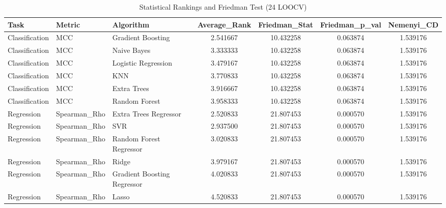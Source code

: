 \begin{table}
\caption{Statistical Rankings and Friedman Test (24 LOOCV)}
\label{tab:stat_ranks}
\begin{tabular}{lllcccc}
\toprule
Task & Metric & Algorithm & Average_Rank & Friedman_Stat & Friedman_p_val & Nemenyi_CD \\
\midrule
Classification & MCC & Gradient Boosting & 2.541667 & 10.432258 & 0.063874 & 1.539176 \\
Classification & MCC & Naive Bayes & 3.333333 & 10.432258 & 0.063874 & 1.539176 \\
Classification & MCC & Logistic Regression & 3.479167 & 10.432258 & 0.063874 & 1.539176 \\
Classification & MCC & KNN & 3.770833 & 10.432258 & 0.063874 & 1.539176 \\
Classification & MCC & Extra Trees & 3.916667 & 10.432258 & 0.063874 & 1.539176 \\
Classification & MCC & Random Forest & 3.958333 & 10.432258 & 0.063874 & 1.539176 \\
Regression & Spearman_Rho & Extra Trees Regressor & 2.520833 & 21.807453 & 0.000570 & 1.539176 \\
Regression & Spearman_Rho & SVR & 2.937500 & 21.807453 & 0.000570 & 1.539176 \\
Regression & Spearman_Rho & Random Forest Regressor & 3.020833 & 21.807453 & 0.000570 & 1.539176 \\
Regression & Spearman_Rho & Ridge & 3.979167 & 21.807453 & 0.000570 & 1.539176 \\
Regression & Spearman_Rho & Gradient Boosting Regressor & 4.020833 & 21.807453 & 0.000570 & 1.539176 \\
Regression & Spearman_Rho & Lasso & 4.520833 & 21.807453 & 0.000570 & 1.539176 \\
\bottomrule
\end{tabular}
\end{table}
